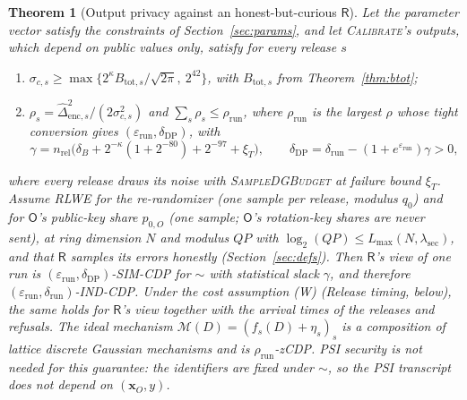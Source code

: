 \documentclass[11pt]{article}
\theoremstyle{definition}
\theoremstyle{plain}
\newtheorem{theorem}{Theorem}[section]
\newcommand{\bx}{\mathbf{x}}
\newcommand{\Party}[1]{\textsf{#1}}
\newcommand{\Rp}{\Party{R}}
\newcommand{\Op}{\Party{O}}
\begin{document}
\begin{theorem}[Output privacy against an honest-but-curious $\Rp$]
\label{thm:output}
Let the parameter vector satisfy the constraints of Section~\ref{sec:params}, and let \textup{\textsc{Calibrate}}'s outputs, which depend on public values only, satisfy for every release $s$
\begin{enumerate}[noitemsep, label=(\roman*)]
  \item $\sigma_{c,s} \ge \max\{2^{\kappa}B_{\mathrm{tot},s}/\sqrt{2\pi},\ 2^{42}\}$, with $B_{\mathrm{tot},s}$ from Theorem~\ref{thm:btot};
  \item $\rho_s = \widehat\Delta_{\mathrm{enc},s}^2/(2\sigma_{c,s}^2)$ and $\sum_s\rho_s \le \rho_{\mathrm{run}}$, where $\rho_{\mathrm{run}}$ is the largest $\rho$ whose tight conversion gives $(\varepsilon_{\mathrm{run}}, \delta_{\mathrm{DP}})$, with
  \[
    \gamma = n_{\mathrm{rel}}\bigl(\delta_B + 2^{-\kappa}(1 + 2^{-80}) + 2^{-97} + \xi_T\bigr), \qquad \delta_{\mathrm{DP}} = \delta_{\mathrm{run}} - (1 + e^{\varepsilon_{\mathrm{run}}})\gamma > 0 ,
  \]
\end{enumerate}
where every release draws its noise with \textsc{SampleDGBudget} at failure bound $\xi_T$. Assume RLWE for the re-randomizer (one sample per release, modulus $q_0$) and for $\Op$'s public-key share $p_{0,O}$ (one sample; $\Op$'s rotation-key shares are never sent), at ring dimension $N$ and modulus $QP$ with $\log_2(QP) \le L_{\max}(N, \lambda_{\mathrm{sec}})$, and that $\Rp$ samples its errors honestly (Section~\ref{sec:defs}). Then $\Rp$'s view of one run is $(\varepsilon_{\mathrm{run}}, \delta_{\mathrm{DP}})$-SIM-CDP for $\sim$ with statistical slack $\gamma$, and therefore $(\varepsilon_{\mathrm{run}}, \delta_{\mathrm{run}})$-IND-CDP. Under the cost assumption (W) (Release timing, below), the same holds for $\Rp$'s view together with the arrival times of the releases and refusals. The ideal mechanism $\mathcal M(D) = (f_s(D) + \eta_s)_s$ is a composition of lattice discrete Gaussian mechanisms and is $\rho_{\mathrm{run}}$-zCDP. PSI security is not needed for this guarantee: the identifiers are fixed under $\sim$, so the PSI transcript does not depend on $(\bx_O, y)$.
\end{theorem}
\end{document}
